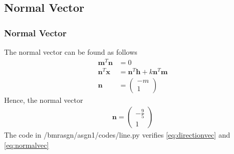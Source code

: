 \documentclass{beamer}
\theoremstyle{remark}
\newcommand{\myvec}[1]{\ensuremath{\begin{pmatrix}#1\end{pmatrix}}} %
\let\vec\mathbf %
\numberwithin{equation}{section}
\begin{document}
\subsection{Normal Vector}
\begin{frame}
\frametitle{Normal Vector}
The normal vector can be found as follows \\
        \begin{align}
            \vec{m}^T\vec{n} &= 0 \\
            \vec{n}^T\vec{x} &= \vec{n}^T\vec{h} + k\vec{n}^T\vec{m} \\
            \vec{n} &= \myvec{-m \\ 1}
        \end{align}
Hence, the normal vector \\ 
        \begin{align}
        \label{eq:normalvec}
            \vec{n} = \myvec{-\frac{9}{5} \\ 1}
        \end{align}
The code in /bmrasgn/asgn1/codes/line.py verifies \eqref{eq:directionvec} and \eqref{eq:normalvec}
\end{frame}
\end{document}

